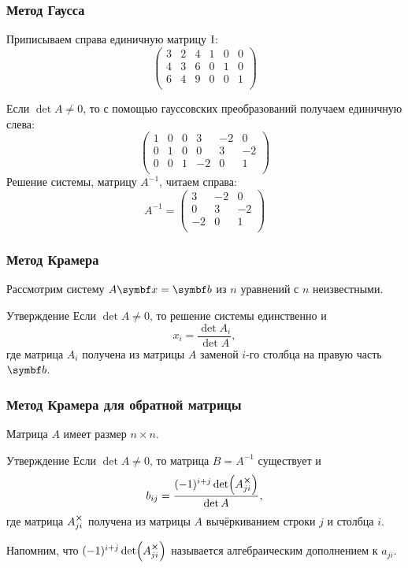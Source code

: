 \begin{frame}
\frametitle{Метод Гаусса}

Приписываем справа единичную матрицу $\mathrm{I}$:
\[
\left(
\begin{array}{ccc|ccc}
3 & 2 & 4  & 1 & 0 & 0 \\
4 & 3 & 6 & 0 & 1 & 0 \\
6 & 4 & 9  & 0 & 0 & 1\\
\end{array}
\right)
\]

Если $\det A\neq 0$, то с помощью гауссовских преобразований получаем единичную слева:
\[
\left(
\begin{array}{ccc|ccc}
1 & 0 & 0  & 3 & -2 & 0 \\
0 & 1 & 0 & 0 & 3 & -2 \\
0 & 0 & 1  & -2 & 0 & 1\\
\end{array}
\right)
\]
\pause
Решение системы, матрицу $A^{-1}$, читаем справа:
\[
A^{-1} =   \begin{pmatrix}
 3 & -2 & 0 \\
 0 & 3 & -2 \\
 -2 & 0 & 1\\
\end{pmatrix} 
\]

\end{frame}



\begin{frame}
    \frametitle{Метод Крамера}

    Рассмотрим систему $A\bx = \bb$ из $n$ уравнений с $n$ неизвестными.

    \pause

    \begin{block}{Утверждение}
        Если $\det A \neq 0$, то решение системы единственно и 
        \[
        x_i = \frac{\det A_i}{\det A},    
        \]
        где матрица $A_i$ получена из матрицы $A$ заменой $i$-го столбца на правую часть $\bb$.
    \end{block}


\end{frame}


\begin{frame}
    \frametitle{Метод Крамера для обратной матрицы}

    Матрица $A$ имеет размер $n\times n$.

    \pause

    \begin{block}{Утверждение}
        Если $\det A \neq 0$, то матрица $B=A^{-1}$ существует и
        \[
        b_{ij} = \frac{(-1)^{i+j}\det (A_{ji}^{\cross})}{\det A},    
        \]
        где матрица $A_{ji}^{\cross}$ получена из матрицы $A$ вычёркиванием строки $j$ и столбца $i$.
    \end{block}
    \pause

    Напомним, что $(-1)^{i+j}\det (A_{ji}^{\cross})$ называется \alert{алгебраическим дополнением} к $a_{ji}$.

\end{frame}


